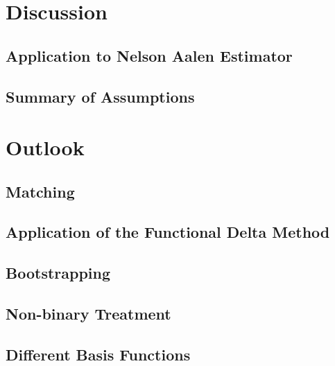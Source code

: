 \section{Discussion}
\subsection{Application to Nelson Aalen Estimator}
  
\subsection{Summary of Assumptions}
  
\section{Outlook}
\subsection{Matching}
  
\subsection{Application of the Functional Delta Method}
  
\subsection{Bootstrapping} 
  
\subsection{Non-binary Treatment}
  
\subsection{Different Basis Functions}
  
